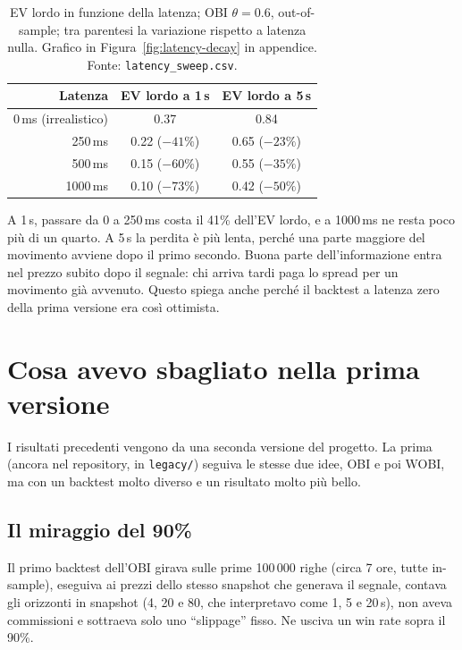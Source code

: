 \documentclass[a4paper,11pt]{article}
\newcommand{\code}[1]{\texttt{#1}}
\begin{document}
\begin{table}[H]
\centering
\small
\caption{EV lordo in funzione della latenza; OBI $\theta=0.6$, out-of-sample; tra parentesi la
variazione rispetto a latenza nulla. Grafico in Figura~\ref{fig:latency-decay} in appendice.
Fonte: \code{latency\_sweep.csv}.}
\label{tab:latenza}
\begin{tabular}{@{}rcc@{}}
\toprule
Latenza & EV lordo a 1\,s & EV lordo a 5\,s \\
\midrule
0\,ms (irrealistico) & 0.37 & 0.84 \\
250\,ms  & 0.22 ($-41\%$) & 0.65 ($-23\%$) \\
500\,ms  & 0.15 ($-60\%$) & 0.55 ($-35\%$) \\
1000\,ms & 0.10 ($-73\%$) & 0.42 ($-50\%$) \\
\bottomrule
\end{tabular}
\end{table}

A 1\,s, passare da 0 a 250\,ms costa il 41\% dell'EV lordo, e a 1000\,ms ne resta poco più di
un quarto. A 5\,s la perdita è più lenta, perché una parte maggiore del movimento avviene dopo
il primo secondo. Buona parte dell'informazione entra nel prezzo subito dopo il segnale: chi
arriva tardi paga lo spread per un movimento già avvenuto. Questo spiega anche perché il backtest
a latenza zero della prima versione era così ottimista.

\section{Cosa avevo sbagliato nella prima versione}
\label{sec:v1}

I risultati precedenti vengono da una seconda versione del progetto. La prima (ancora nel
repository, in \code{legacy/}) seguiva le stesse due idee, OBI e poi WOBI, ma con un
backtest molto diverso e un risultato molto più bello.

\subsection{Il miraggio del 90\%}

Il primo backtest dell'OBI girava sulle prime 100\,000 righe (circa 7 ore, tutte in-sample),
eseguiva ai prezzi dello stesso snapshot che generava il segnale, contava gli orizzonti in
snapshot (4, 20 e 80, che interpretavo come 1, 5 e 20\,s), non aveva commissioni e sottraeva
solo uno ``slippage'' fisso. Ne usciva un win rate sopra il 90\%.
\end{document}
